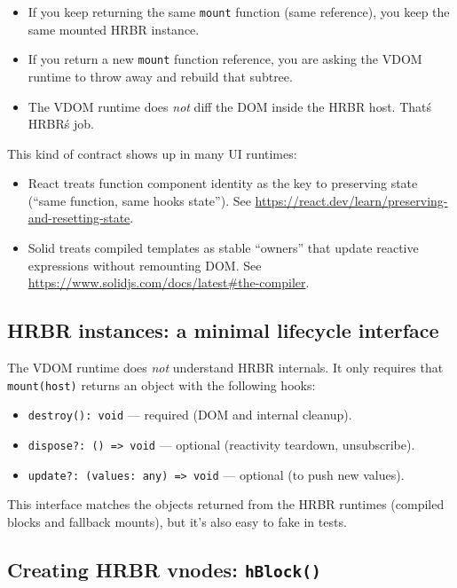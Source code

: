 \begin{itemize}
\item If you keep returning the same \texttt{mount} function (same reference), you keep the same mounted HRBR instance.
\item If you return a new \texttt{mount} function reference, you are asking the VDOM runtime to throw away and rebuild that subtree.
\item The VDOM runtime does \emph{not} diff the DOM inside the HRBR host. That\'s HRBR\'s job.
\end{itemize}

This kind of contract shows up in many UI runtimes:

\begin{itemize}
\item React treats function component identity as the key to preserving state (``same function, same hooks state''). See \href{https://react.dev/learn/preserving-and-resetting-state}{https://react.dev/learn/preserving-and-resetting-state}.
\item Solid treats compiled templates as stable ``owners'' that update reactive expressions without remounting DOM. See \href{https://www.solidjs.com/docs/latest\#the-compiler}{https://www.solidjs.com/docs/latest\#the-compiler}.
\end{itemize}

\subsection{HRBR instances: a minimal lifecycle interface}

The VDOM runtime does \emph{not} understand HRBR internals. It only requires that \texttt{mount(host)} returns an object with the following hooks:

\begin{itemize}
\item \texttt{destroy(): void} --- required (DOM and internal cleanup).
\item \texttt{dispose?: () => void} --- optional (reactivity teardown, unsubscribe).
\item \texttt{update?: (values: any) => void} --- optional (to push new values).
\end{itemize}

This interface matches the objects returned from the HRBR runtimes (compiled blocks and fallback mounts), but it's also easy to fake in tests.

\subsection{Creating HRBR vnodes: \texttt{hBlock()}}

